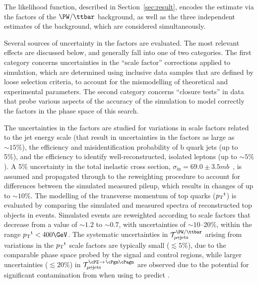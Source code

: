 The likelihood function, described in Section~\ref{sec:result},
encodes the estimate via the \tf factors of the $\PW/\ttbar$ background, as
well as the three independent estimates of the \znunu background,
which are considered simultaneously.

Several sources of uncertainty in the \tf factors are evaluated.  The most
relevant effects are discussed below, and generally fall into one of
two categories. The first category concerns uncertainties in the
``scale factor'' corrections applied to simulation, which are
determined using inclusive data samples that are defined by loose
selection criteria, to account for the mismodelling of theoretical and
experimental parameters. The second category concerns ``closure
tests'' in data that probe various aspects of the accuracy of the
simulation to model correctly the \tf factors in the phase space of this
search.

The uncertainties in the \tf factors are studied for variations in scale
factors related to the jet energy scale (that result in uncertainties
in the \tf factors as large as $\sim 15\%$), the efficiency and
misidentification probability of b quark jets (up to 5\%), and the
efficiency to identify well-reconstructed, isolated leptons (up to
$\sim 5\%$). A 5\% uncertainty in the total inelastic cross section,
$\sigma_\text{in} = 69.0 \pm 3.5\unit{mb}$~\cite{Aaboud:2016mmw}, is
assumed and propagated through to the reweighting procedure to account
for differences between the simulated measured pileup, which results
in changes of up to $\sim 10\%$. The modelling of the transverse
momentum of top quarks (${p_{\text T}}^\text{t}$) is evaluated by comparing the
simulated and measured \Pt spectra of reconstructed top objects in
\ttbar events.
Simulated events are reweighted according to scale factors that
decrease from a value of $\sim 1.2$ to $\sim 0.7$, with uncertainties of
$\sim 10$--20\%, within the range $\Pt^\text{t} < 400\GeV$.
The systematic uncertainties in $\tf^\text{\PW/\ttbar}_{\mj}$ arising
from variations in the ${p_{\text T}}^\text{t}$ scale factors are typically
small ($\lesssim 5\%$), due to the comparable phase space probed by the
signal and control regions, while larger uncertainties
($\lesssim 20\%$) in $\tf^{\text{\znunu}}_{\mj}$ are observed due to
the potential for significant contamination from \ttbar when using
\wlj to predict \znunuj.

